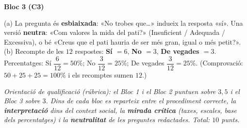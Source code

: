\begin{solucions}
\noindent\textbf{Bloc 3 (C3)}
\begin{sollist}\setcounter{enumi}{4}
  \item (a) La pregunta és \textbf{esbiaixada}: «No trobes que\dots» indueix la
        resposta «sí». Una versió \textbf{neutra}: «Com valores la mida del pati?»
        (Insuficient / Adequada / Excessiva), o bé «Creus que el pati hauria de ser més
        gran, igual o més petit?». \quad
        (b) Recompte de les $12$ respostes: \textbf{Sí $=6$}, \textbf{No $=3$},
        \textbf{De vegades $=3$}. Percentatges: Sí $\dfrac{6}{12}=50\%$; No
        $\dfrac{3}{12}=25\%$; De vegades $\dfrac{3}{12}=25\%$. (Comprovació:
        $50+25+25=100\%$ i els recomptes sumen $12$.)
\end{sollist}

\end{solucions}

\noindent\small\textit{Orientació de qualificació (rúbrica): el Bloc 1 i el Bloc 2
puntuen sobre $3,5$ i el Bloc 3 sobre $3$. Dins de cada bloc es reparteix entre el
procediment correcte, la \textbf{interpretació} dins del context social, la
\textbf{mirada crítica} (taxes, escales, base dels percentatges) i la
\textbf{neutralitat} de les preguntes redactades. Total: $10$ punts.}
